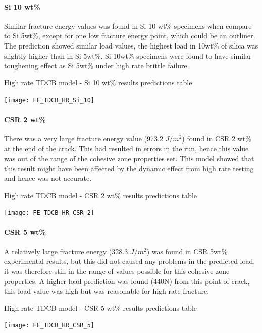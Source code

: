 \documentclass[numbers=noendperiod,chapterprefix=on]{icldt} %
\begin{document}
{\paragraph{Si 10 wt\%}
 Similar fracture energy values was found in Si 10 wt\% specimens when compare to Si 5wt\%, except for one low fracture energy point, which could be an outliner. The prediction showed similar load values, the highest load in 10wt\% of silica was slightly higher than in Si 5wt\%. Si 10wt\% specimens were found to have similar toughening effect as Si 5wt\% under high rate brittle failure.
      
    \begin{table}[!htpb]
        \centering
        \caption{High rate TDCB model - Si 10 wt\% results predictions table}\label{FE_TDCB_HR_Si_10}
        \texttt{[image: FE\_TDCB\_HR\_Si\_10]}
        \end{table}
        \FloatBarrier
    
\paragraph{CSR 2 wt\%} 
There was a very large fracture energy value (973.2 $ J/m^{2} $) found in CSR 2 wt\% at the end of the crack. This had resulted in errors in the run, hence this value was out of the range of the cohesive zone properties set. This model showed that this result might have been affected by the dynamic effect from high rate testing and hence was not accurate.        
    
 \begin{table}[!htpb]
     \centering
     \caption{High rate TDCB model - CSR 2 wt\% results predictions table}\label{FE_TDCB_HR_CSR_2}
     \texttt{[image: FE\_TDCB\_HR\_CSR\_2]}
     \end{table}
     \FloatBarrier   
     
\paragraph{CSR 5 wt\%}      
 A relatively large fracture energy (328.3 $ J/m^{2} $) was found in CSR 5wt\% experimental results, but this did not caused any problems in the predicted load, it was therefore still in the range of values possible for this cohesive zone properties. A higher load prediction was found (440N) from this point of crack, this load value was high but was reasonable for high rate fracture.  
   
 \begin{table}[!htpb]
        \centering
        \caption{High rate TDCB model - CSR 5 wt\% results predictions table}\label{FE_TDCB_HR_CSR_5}
        \texttt{[image: FE\_TDCB\_HR\_CSR\_5]}
        \end{table}
        \FloatBarrier      

}
\end{document}
